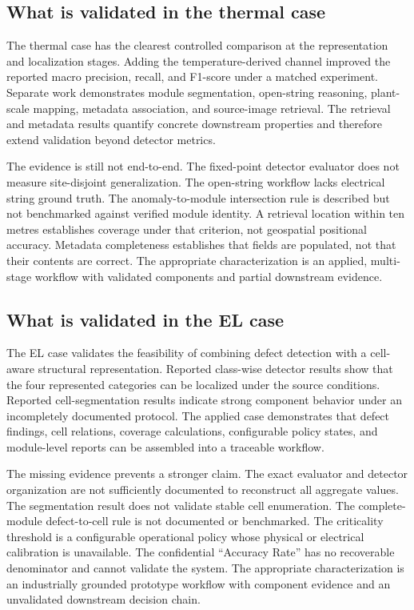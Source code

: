 \documentclass[12pt,a4paper]{report}
\begin{document}
\subsection{What is validated in the thermal case}

The thermal case has the clearest controlled comparison at the representation and localization stages. Adding the temperature-derived channel improved the reported macro precision, recall, and F1-score under a matched experiment. Separate work demonstrates module segmentation, open-string reasoning, plant-scale mapping, metadata association, and source-image retrieval. The retrieval and metadata results quantify concrete downstream properties and therefore extend validation beyond detector metrics.

The evidence is still not end-to-end. The fixed-point detector evaluator does not measure site-disjoint generalization. The open-string workflow lacks electrical string ground truth. The anomaly-to-module intersection rule is described but not benchmarked against verified module identity. A retrieval location within ten metres establishes coverage under that criterion, not geospatial positional accuracy. Metadata completeness establishes that fields are populated, not that their contents are correct. The appropriate characterization is an applied, multi-stage workflow with validated components and partial downstream evidence.

\subsection{What is validated in the EL case}

The EL case validates the feasibility of combining defect detection with a cell-aware structural representation. Reported class-wise detector results show that the four represented categories can be localized under the source conditions. Reported cell-segmentation results indicate strong component behavior under an incompletely documented protocol. The applied case demonstrates that defect findings, cell relations, coverage calculations, configurable policy states, and module-level reports can be assembled into a traceable workflow.

The missing evidence prevents a stronger claim. The exact evaluator and detector organization are not sufficiently documented to reconstruct all aggregate values. The segmentation result does not validate stable cell enumeration. The complete-module defect-to-cell rule is not documented or benchmarked. The criticality threshold is a configurable operational policy whose physical or electrical calibration is unavailable. The confidential ``Accuracy Rate'' has no recoverable denominator and cannot validate the system. The appropriate characterization is an industrially grounded prototype workflow with component evidence and an unvalidated downstream decision chain.
\end{document}
